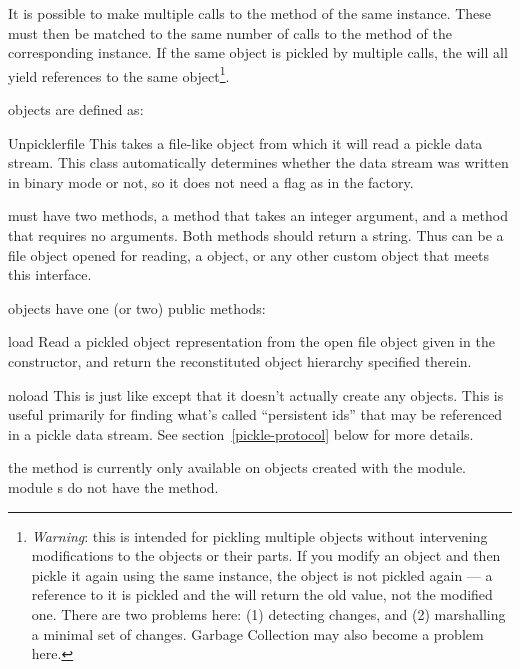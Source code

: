 It is possible to make multiple calls to the  method of
the same  instance.  These must then be matched to the
same number of calls to the  method of the
corresponding  instance.  If the same object is
pickled by multiple  calls, the  will
all yield references to the same object\footnote{\emph{Warning}: this
is intended for pickling multiple objects without intervening
modifications to the objects or their parts.  If you modify an object
and then pickle it again using the same  instance, the
object is not pickled again --- a reference to it is pickled and the
 will return the old value, not the modified one.
There are two problems here: (1) detecting changes, and (2)
marshalling a minimal set of changes.  Garbage Collection may also
become a problem here.}.

 objects are defined as:

\begin{classdesc}{Unpickler}{file}
This takes a file-like object from which it will read a pickle data
stream.  This class automatically determines whether the data stream
was written in binary mode or not, so it does not need a flag as in
the  factory.

 must have two methods, a  method that takes
an integer argument, and a  method that requires no
arguments.  Both methods should return a string.  Thus  can
be a file object opened for reading, a
 object, or any other custom
object that meets this interface.
\end{classdesc}

 objects have one (or two) public methods:

\begin{methoddesc}[Unpickler]{load}{}
Read a pickled object representation from the open file object given
in the constructor, and return the reconstituted object hierarchy
specified therein.
\end{methoddesc}

\begin{methoddesc}[Unpickler]{noload}{}
This is just like  except that it doesn't actually
create any objects.  This is useful primarily for finding what's
called ``persistent ids'' that may be referenced in a pickle data
stream.  See section~\ref{pickle-protocol} below for more details.

 the  method is currently only
available on  objects created with the
 module.   module s do
not have the  method.
\end{methoddesc}

